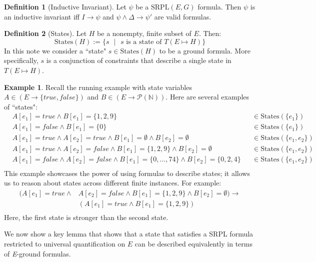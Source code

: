 \documentclass[12pt]{article}
\theoremstyle{definition}
\newtheorem{definition}{Definition}
\newtheorem{example}{Example}
\theoremstyle{remark}
\newcommand{\st}{\text{ }|\text{ }}
\newcommand{\states}{\text{States}}
\newcommand{\SRPL}{\text{SRPL}}
\begin{document}
\begin{definition}[Inductive Invariant]
  Let $\psi$ be a $\SRPL(E,G)$ formula.  Then $\psi$ is an inductive invariant iff $I \rightarrow \psi$ and $\psi \land \Delta \rightarrow \psi'$ are valid formulas.
\end{definition}

\begin{definition}[States]
  Let $H$ be a nonempty, finite subset of $E$.  Then:
  $$\states(H) := \{s \st s \text{ is a state of } T(E \mapsto H)\}$$
  In this note we consider a ``state" $s \in \states(H)$ to be a ground formula.  More specifically, $s$ is a conjunction of constraints that describe a single state in $T(E \mapsto H)$.
\end{definition}

\begin{example}
  Recall the running example with state variables $A \in (E \to \{true,false\})$ and $B \in (E \to \mathcal{P}(\mathbb{N}))$.  Here are several examples of ``states":
  \begin{align*}
    &A[e_1]=true \land B[e_1]=\{1,2,9\}& &\in \states(\{e_1\})\\
    &A[e_1]=false \land B[e_1]=\{0\}& &\in \states(\{e_1\})\\
    &A[e_1]=true \land A[e_2]=true \land B[e_1]=\emptyset \land B[e_2]=\emptyset& &\in \states(\{e_1,e_2\})\\
    &A[e_1]=true \land A[e_2]=false \land B[e_1]=\{1,2,9\} \land B[e_2]=\emptyset& &\in \states(\{e_1,e_2\})\\
    &A[e_1]=false \land A[e_2]=false \land B[e_1]=\{0,...,74\} \land B[e_2]=\{0,2,4\}& &\in \states(\{e_1,e_2\})\\
  \end{align*}
  This example showcases the power of using formulas to describe states; it allows us to reason about states across different finite instances.  For example:
  \begin{align*}
    (A[e_1]=true \land& A[e_2]=false \land B[e_1]=\{1,2,9\} \land B[e_2]=\emptyset) \rightarrow\\
    &(A[e_1]=true \land B[e_1]=\{1,2,9\})\\
  \end{align*}
  Here, the first state is stronger than the second state.
\end{example}

We now show a key lemma that shows that a state that satisfies a SRPL formula restricted to universal quantification on $E$ can be described equivalently in terms of \textit{E}-ground formulas.
\end{document}

